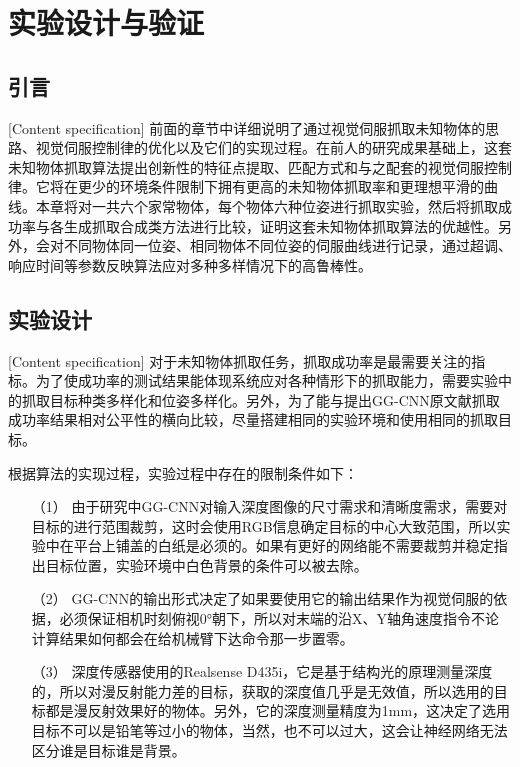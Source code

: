 \documentclass[fontset=fandol,type=bachelor,campus=harbin,bsmainpagenumberline=true]{hithesisbook}
\begin{document}
\chapter{实验设计与验证}
\section{引言}[Content specification]
前面的章节中详细说明了通过视觉伺服抓取未知物体的思路、视觉伺服控制律的优化以及它们的实现过程。在前人的研究成果基础上，这套未知物体抓取算法提出创新性的特征点提取、匹配方式和与之配套的视觉伺服控制律。它将在更少的环境条件限制下拥有更高的未知物体抓取率和更理想平滑的曲线。本章将对一共六个家常物体，每个物体六种位姿进行抓取实验，然后将抓取成功率与各生成抓取合成类方法进行比较，证明这套未知物体抓取算法的优越性。另外，会对不同物体同一位姿、相同物体不同位姿的伺服曲线进行记录，通过超调、响应时间等参数反映算法应对多种多样情况下的高鲁棒性。

\section{实验设计}[Content specification]
对于未知物体抓取任务，抓取成功率是最需要关注的指标。为了使成功率的测试结果能体现系统应对各种情形下的抓取能力，需要实验中的抓取目标种类多样化和位姿多样化。另外，为了能与提出GG-CNN原文献抓取成功率结果相对公平性的横向比较，尽量搭建相同的实验环境和使用相同的抓取目标。


根据算法的实现过程，实验过程中存在的限制条件如下：
\begin{itemize}
\item[（1）]
由于研究中GG-CNN对输入深度图像的尺寸需求和清晰度需求，需要对目标的进行范围裁剪，这时会使用RGB信息确定目标的中心大致范围，所以实验中在平台上铺盖的白纸是必须的。如果有更好的网络能不需要裁剪并稳定指出目标位置，实验环境中白色背景的条件可以被去除。
\item[（2）]
GG-CNN的输出形式决定了如果要使用它的输出结果作为视觉伺服的依据，必须保证相机时刻俯视0°朝下，所以对末端的沿X、Y轴角速度指令不论计算结果如何都会在给机械臂下达命令那一步置零。
\item[（3）]
深度传感器使用的Realsense D435i，它是基于结构光的原理测量深度的，所以对漫反射能力差的目标，获取的深度值几乎是无效值，所以选用的目标都是漫反射效果好的物体。另外，它的深度测量精度为1mm，这决定了选用目标不可以是铅笔等过小的物体，当然，也不可以过大，这会让神经网络无法区分谁是目标谁是背景。
\end{itemize}
\end{document}
